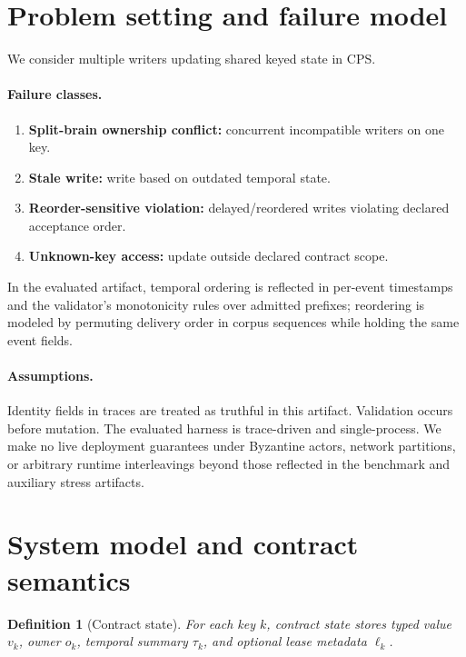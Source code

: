 \documentclass[11pt]{article}
\newtheorem{definition}{Definition}
\begin{document}
\section{Problem setting and failure model}

We consider multiple writers updating shared keyed state in CPS.

\paragraph{Failure classes.}
\begin{enumerate}[leftmargin=1.5em]
\item \textbf{Split-brain ownership conflict:} concurrent incompatible writers on one key.
\item \textbf{Stale write:} write based on outdated temporal state.
\item \textbf{Reorder-sensitive violation:} delayed/reordered writes violating declared acceptance order.
\item \textbf{Unknown-key access:} update outside declared contract scope.
\end{enumerate}

In the evaluated artifact, temporal ordering is reflected in per-event timestamps and the validator's monotonicity rules over admitted prefixes; reordering is modeled by permuting delivery order in corpus sequences while holding the same event fields.

\paragraph{Assumptions.}
Identity fields in traces are treated as truthful in this artifact. Validation occurs before mutation. The evaluated harness is trace-driven and single-process. We make no live deployment guarantees under Byzantine actors, network partitions, or arbitrary runtime interleavings beyond those reflected in the benchmark and auxiliary stress artifacts.

\section{System model and contract semantics}

\begin{definition}[Contract state]
For each key $k$, contract state stores typed value $v_k$, owner $o_k$, temporal summary $\tau_k$, and optional lease metadata $\ell_k$.
\end{definition}
\end{document}
